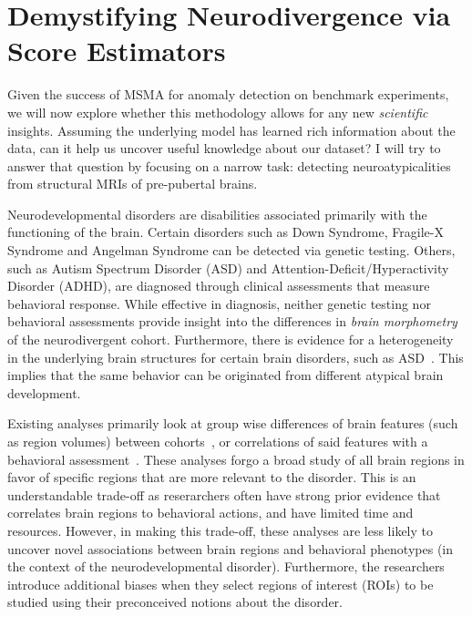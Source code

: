 \chapter{Demystifying Neurodivergence via Score Estimators }
\label{ch:demyst}

Given the success of MSMA for anomaly detection on benchmark experiments, we will now explore whether this methodology allows for any new \textit{scientific} insights.
Assuming the underlying model has learned rich information about the data, can it help us uncover useful knowledge about our dataset? I will try to answer that question by focusing on a narrow task: detecting neuroatypicalities from structural MRIs of pre-pubertal brains.

Neurodevelopmental disorders are disabilities associated primarily with the functioning of the brain. Certain disorders such as Down Syndrome, Fragile-X Syndrome and Angelman Syndrome can be detected via genetic testing. Others, such as Autism Spectrum Disorder (ASD) and Attention-Deficit/Hyperactivity Disorder (ADHD), are diagnosed through clinical assessments that measure behavioral response. While effective in diagnosis, neither genetic testing nor behavioral assessments provide insight into the differences in \textit{brain morphometry} of the neurodivergent cohort. Furthermore, there is evidence for a heterogeneity in the underlying brain structures for certain brain disorders, such as ASD~\cite{heteroasd}. This implies that the same behavior can be originated from different atypical brain development.

Existing analyses primarily look at group wise differences of brain features (such as region volumes) between cohorts~\cite{giraultNeurodevelopmentAutismInfancy2020,hamnerPediatricBrainDevelopment2018}, or correlations of said features with a behavioral assessment~\cite{shenSubcorticalBrainDevelopment2022,brainsci12040439}.
These analyses forgo a broad study of all brain regions in favor of specific regions that are more relevant to the disorder. This is an understandable trade-off as reserarchers often have strong prior evidence that correlates brain regions to behavioral actions, and have limited time and resources. However, in making this trade-off, these analyses are less likely to uncover novel associations between brain regions and behavioral phenotypes (in the context of the neurodevelopmental disorder).
Furthermore, the researchers introduce additional biases when they select regions of interest (ROIs) to be studied using their preconceived notions about the disorder.

